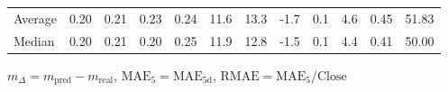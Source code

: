 \begin{threeparttable}
{\begin{tabular}{lrrrrrrrrrrr}
Average &          0.20 &          0.21 &          0.23 &        0.24 &                11.6 &                13.3 &       -1.7 &                 0.1 &              4.6 &            0.45 &                  51.83 \\
 Median &          0.20 &          0.21 &          0.20 &        0.25 &                11.9 &                12.8 &       -1.5 &                 0.1 &              4.4 &            0.41 &                  50.00 \\
\bottomrule
\end{tabular}
}
\begin{tablenotes}\footnotesize
\item $m_\Delta=m_{\text{pred}}-m_{\text{real}}$,
$\mathrm{MAE}_5=\mathrm{MAE}_{5\text{d}}$,
$\mathrm{RMAE}=\mathrm{MAE}_5/\text{Close}$
\end{tablenotes}
\end{threeparttable}
\endgroup


